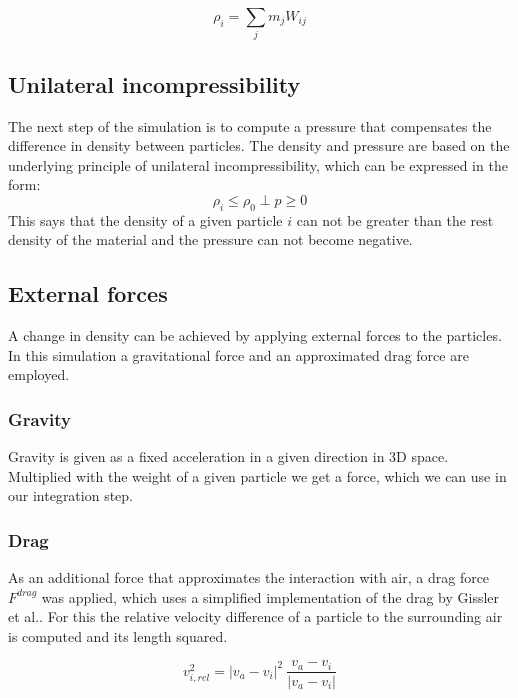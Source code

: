 \documentclass[intern]{cgMA}
\begin{document}
    \begin{equation}
        \rho_i = \sum_j m_j W_{ij}
    \end{equation}

    \subsection{Unilateral incompressibility}  
    The next step of the simulation is to compute a pressure that compensates the difference in density between particles. The density and pressure are based on the underlying principle of unilateral incompressibility, which can be expressed in the form: 
    \begin{equation}
        \rho_i \leq \rho_0 \; \bot \;  p \geq 0
    \end{equation}
    This says that the density of a given particle $i$ can not be greater than the rest density of the material and the pressure can not become negative. \cite{10.1145/2019406.2019410}

    \subsection{External forces}
    A change in density can be achieved by applying external forces to the particles. In this simulation a gravitational force and an approximated drag force are employed.
    \subsubsection{Gravity}
    Gravity is given as a fixed acceleration in a given direction in 3D space. Multiplied with the weight of a given particle we get a force, which we can use in our integration step.
    \subsubsection{Drag}
    As an additional force that approximates the interaction with air, a drag force $F^{drag}$ was applied, which uses a simplified implementation of the drag by Gissler et al.\cite{10.1016/j.cag.2017.09.002}. For this the relative velocity difference of a particle to the surrounding air is computed and its length squared. 

    \begin{equation}
        \label{eq:v_rel}
        v^2_{i,rel} = |v_a - v_i|^2\ \frac{v_a - v_i}{|v_a - v_i|}
    \end{equation}
\end{document}
